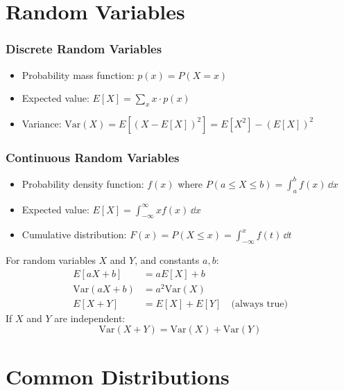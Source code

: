 \section{Random Variables}

\subsubsection{Discrete Random Variables}
\begin{itemize}
    \item Probability mass function: $p(x) = P(X = x)$
    \item Expected value: $E[X] = \sum_x x \cdot p(x)$
    \item Variance: $\text{Var}(X) = E[(X - E[X])^2] = E[X^2] - (E[X])^2$
\end{itemize}

\subsubsection{Continuous Random Variables}
\begin{itemize}
    \item Probability density function: $f(x)$ where $P(a \leq X \leq b) = \int_a^b f(x)\,\dd x$
    \item Expected value: $E[X] = \int_{-\infty}^{\infty} x f(x)\,\dd x$
    \item Cumulative distribution: $F(x) = P(X \leq x) = \int_{-\infty}^x f(t)\,\dd t$
\end{itemize}

\begin{keyconceptbox}[title=Properties of Expectation and Variance]
For random variables $X$ and $Y$, and constants $a, b$:
\begin{align}
E[aX + b] &= aE[X] + b \\
\text{Var}(aX + b) &= a^2\text{Var}(X) \\
E[X + Y] &= E[X] + E[Y] \quad \text{(always true)}
\end{align}
If $X$ and $Y$ are independent:
\begin{equation}
\text{Var}(X + Y) = \text{Var}(X) + \text{Var}(Y)
\end{equation}
\end{keyconceptbox}

\section{Common Distributions}

